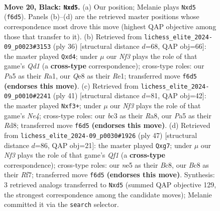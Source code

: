 \documentclass[11pt]{article}
\begin{document}
\clearpage

\begin{figure}[p]\centering
\begin{subfigure}{0.46\textwidth}\centering
\resizebox{\linewidth}{!}{%
\newchessgame
\chessboard[
  setfen={rnb1q1k1/1p2r1pp/5n2/p2BNp2/8/2B1P1P1/P4P1P/1R1QR1K1 b - - 0 20},
  showmover=false,
  pgfstyle=straightmove, color=movearrow, markmove={f6-d5}
]}
\caption{}
\end{subfigure}\hfill
\begin{subfigure}{0.46\textwidth}\centering
\resizebox{\linewidth}{!}{%
\newchessgame
\chessboard[
  setfen={r1q1r1k1/1p1b1p1p/p2p1pn1/8/3bP3/6NP/PPB2PP1/R2QR1K1 w - - 0 19},
  showmover=false,
  pgfstyle=straightmove, color=movearrow, markmove={d1-d4}
]}
\caption{}
\end{subfigure}
\\[4pt]
\begin{subfigure}{0.46\textwidth}\centering
\resizebox{\linewidth}{!}{%
\newchessgame
\chessboard[
  setfen={r2r2k1/pp3ppp/3b1n2/q3n3/5N2/4BBP1/PP2QP1P/R2R2K1 b - - 2 21},
  showmover=false,
  pgfstyle=straightmove, color=movearrow, markmove={e5-f3}
]}
\caption{}
\end{subfigure}\hfill
\begin{subfigure}{0.46\textwidth}\centering
\resizebox{\linewidth}{!}{%
\newchessgame
\chessboard[
  setfen={r1b2qk1/5rBp/ppNp2n1/3P4/4ppP1/8/PP2B1PP/2RQ1RK1 b - - 0 24},
  showmover=false,
  pgfstyle=straightmove, color=movearrow, markmove={f8-g7}
]}
\caption{}
\end{subfigure}
\caption{\textbf{Move 20, Black: \texttt{Nxd5}.} (a) Our position; Melanie plays \texttt{Nxd5} (\texttt{f6d5}). Panels (b)--(d) are the retrieved master positions whose correspondence most drove this move (highest QAP objective among those that transfer to it). (b) Retrieved from \texttt{lichess\_elite\_2024-09\_p0023\#3153} (ply 36) [structural distance $d$=68, QAP obj=66]: the master played \texttt{Qxd4}; under $\mu$ our \emph{Nf3} plays the role of that game's \emph{Qd1} (a \textbf{cross-type} correspondence); cross-type roles: our \emph{P}a5 as their \emph{R}a1, our \emph{Q}e8 as their \emph{R}e1; transferred move \texttt{f6d5} \textbf{(endorses this move)}. (c) Retrieved from \texttt{lichess\_elite\_2024-09\_p0010\#2241} (ply 41) [structural distance $d$=81, QAP obj=42]: the master played \texttt{Nxf3+}; under $\mu$ our \emph{Nf3} plays the role of that game's \emph{Ne4}; cross-type roles: our \emph{b}c3 as their \emph{R}a8, our \emph{P}a5 as their \emph{R}d8; transferred move \texttt{f6d5} \textbf{(endorses this move)}. (d) Retrieved from \texttt{lichess\_elite\_2024-09\_p0030\#1926} (ply 47) [structural distance $d$=86, QAP obj=21]: the master played \texttt{Qxg7}; under $\mu$ our \emph{Nf3} plays the role of that game's \emph{Qf1} (a \textbf{cross-type} correspondence); cross-type roles: our \emph{n}e5 as their \emph{B}c8, our \emph{B}c8 as their \emph{R}f7; transferred move \texttt{f6d5} \textbf{(endorses this move)}. Synthesis: 3 retrieved analogs transferred to \texttt{Nxd5} (summed QAP objective 129, the strongest correspondence among the candidate moves); Melanie committed it via the \texttt{search} selector.}
\label{fig:thought-m39}
\end{figure}
\end{document}
